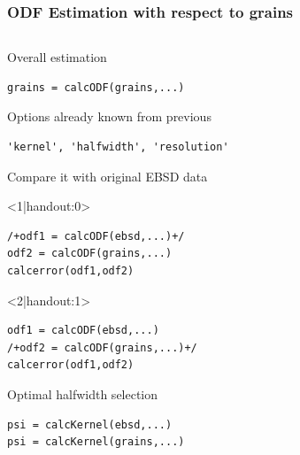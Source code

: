 \begin{frame}[fragile]
  \frametitle{ODF Estimation with respect to grains}


\begin{columns}[t]
\begin{column}[T]{8cm}

Overall estimation

\begin{lstlisting}
grains = calcODF(grains,...)
\end{lstlisting}

\medskip

Options already known from previous
\begin{lstlisting}[basicstyle=\footnotesize]
'kernel', 'halfwidth', 'resolution'
\end{lstlisting}

\medskip

Compare it with original EBSD data
\begin{onlyenv}<1|handout:0>
\begin{lstlisting}
/+odf1 = calcODF(ebsd,...)+/
odf2 = calcODF(grains,...)
calcerror(odf1,odf2)
\end{lstlisting}
\end{onlyenv}

\begin{onlyenv}<2|handout:1>
\begin{lstlisting}
odf1 = calcODF(ebsd,...)
/+odf2 = calcODF(grains,...)+/
calcerror(odf1,odf2)
\end{lstlisting}
\end{onlyenv}

\pause


Optimal halfwidth selection
\begin{lstlisting}
psi = calcKernel(ebsd,...)
psi = calcKernel(grains,...)
\end{lstlisting}



\end{column}
\end{columns}
\end{frame}
